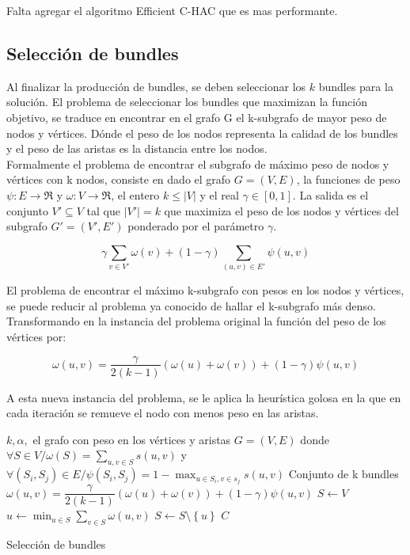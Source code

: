 Falta agregar el algoritmo Efficient C-HAC que es mas performante.

\subsection{Selección de bundles}
Al finalizar la producción de bundles, se deben seleccionar los $k$ bundles para la solución. El problema de seleccionar los bundles que maximizan la función objetivo, se traduce en encontrar en el grafo G el k-subgrafo de mayor peso de nodos y vértices. Dónde el peso de los nodos representa la calidad de los bundles y el peso de las aristas es la distancia entre los nodos.\\
Formalmente el problema de encontrar el subgrafo de máximo peso de nodos y vértices con k nodos, consiste en dado el grafo $ G = (V,E) $, la funciones de peso $\psi : E \rightarrow \Re$ y $\omega : V \rightarrow \Re$, el entero $ k \leq |V| $ y el real $\gamma \in [0,1]$. La salida es el conjunto $V' \subseteq V$ tal que $|V'| = k$ que maximiza el peso de los nodos y vértices del subgrafo $G' = (V', E')$ ponderado por el parámetro $\gamma$.

\begin{equation}
\gamma \sum_{v \in V'}{\omega(v)} + (1 - \gamma) \sum_{(u,v) \in E'}{\psi(u,v)}
\end{equation}

El problema de encontrar el máximo k-subgrafo con pesos en los nodos y vértices, se puede reducir al problema ya conocido de hallar el k-subgrafo más denso\cite{SubgraphProblem}. Transformando en la instancia del problema original la función del peso de los vértices por:
 
\begin{equation}
\omega(u,v) = \dfrac{\gamma}{2( k - 1)} (\omega(u) + \omega(v)) + (1 - \gamma)\psi(u,v) 
\end{equation}

A esta nueva instancia del problema, se le aplica la heurística golosa en la que en cada iteración se remueve el nodo con menos peso en las aristas.\\

\begin{algorithm}[H]
\begin{algorithmic}[1]
\REQUIRE $k, \alpha,$ el grafo con peso en los vértices y aristas  $G=(V,E)$ donde $\forall S \in V / \omega(S) = \sum_{u,v \in S}{s(u,v)}$ y $\forall (S_i,S_j) \in E / \psi(S_i,S_j) = 1 - \max_{u \in S_i, v \in s_j}{s(u,v)}$
\ENSURE Conjunto de k bundles
\STATE $\omega(u,v) = \dfrac{\gamma}{2( k - 1)} (\omega(u) + \omega(v)) + (1 - \gamma)\psi(u,v)$
\STATE $S \leftarrow V$
\STATE $u \leftarrow \min_{u \in S}{\sum_{v \in S}{\omega(u,v)}}$
\STATE $S \leftarrow S \setminus  \left\{u\right\} $
\ENDWHILE
\RETURN $C$
\end{algorithmic}
\caption{Selección de bundles}\label{alg:chooseBundles}
\end{algorithm}


